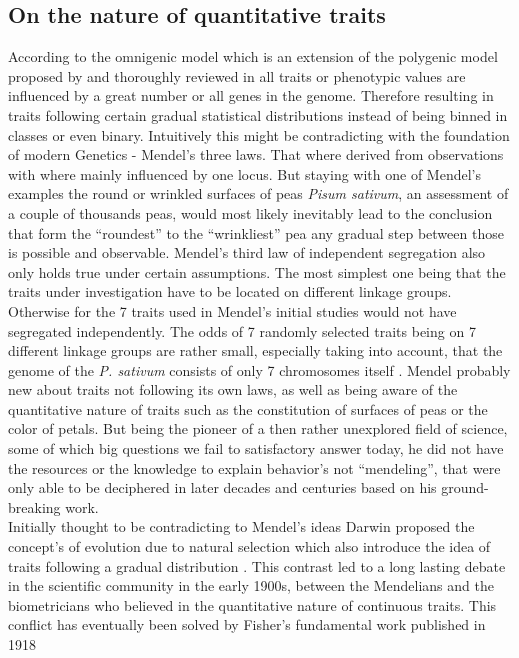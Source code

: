 \subsection{On the nature of quantitative traits}
According to the omnigenic model which is an extension of the polygenic model proposed by
\cite{boyle2017expanded} and thoroughly reviewed in \cite{timpson2018} all traits or phenotypic values are
influenced by a great number or all genes in the genome. Therefore resulting in traits following certain
gradual statistical distributions instead of being binned in classes or even binary. Intuitively this might be
contradicting with the foundation of modern Genetics - Mendel's three laws. That where derived from
observations with where mainly influenced by one locus. But staying with one of Mendel's examples the round or
wrinkled surfaces of peas \textit{Pisum sativum}, an assessment of a couple of thousands peas, would most
likely inevitably lead to the conclusion that form the ``roundest'' to the ``wrinkliest'' pea any gradual step
between those is possible and observable.  Mendel's third law of independent segregation also only holds true
under certain assumptions. The most simplest one being that the traits under investigation have to be located
on different linkage groups. Otherwise for the 7 traits used in Mendel's initial studies would not have
segregated independently. The odds of 7 randomly selected traits being on 7 different linkage groups are
rather small, especially taking into account, that the genome of the \textit{P. sativum} consists of only 7
chromosomes itself \cite{kalo2004}. Mendel probably new about traits not following its own laws, as well as
being aware of the quantitative nature of traits such as the constitution of surfaces of peas or the color of
petals. But being the pioneer of a then rather unexplored field of science, some of which big questions we
fail to satisfactory answer today, he did not have the resources or the knowledge to explain behavior's not
``mendeling'', that were only able to be deciphered in later decades and centuries
based on his ground-breaking work. \\
Initially thought to be contradicting to Mendel's ideas Darwin proposed the concept's of evolution due to
natural selection which also introduce the idea of traits following a gradual distribution
\cite{darwin1859}. This contrast led to a long lasting debate in the scientific community in the early 1900s,
between the Mendelians and the biometricians who believed in the quantitative nature of continuous
traits. This conflict has eventually been solved by Fisher's fundamental work published in 1918
